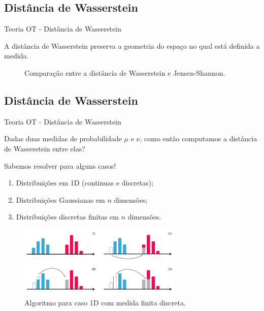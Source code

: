 \documentclass[10pt]{beamer}
\begin{document}
\subsection{Distância de Wasserstein}
\begin{frame}[fragile]{Teoria OT - Distância de Wasserstein}

	A distância de Wasserstein preserva a geometria do espaço
	no qual está definida a medida.

	\begin{figure}[H]
		\centering
		\def\svgscale{0.45}
		
		\caption{Comparação entre a distância de Wasserstein e Jensen-Shannon.}
		\label{fig:pub}
	\end{figure}

\end{frame}

\subsection{Distância de Wasserstein}
\begin{frame}[fragile]{Teoria OT - Distância de Wasserstein}

	Dadas duas medidas de probabilidade $\mu$ e $\nu$,
	como então computamos a distância de Wasserstein
	entre elas?

	\vspace{3mm}
	Sabemos resolver para alguns casos!
	\begin{enumerate}
		\item Distribuições em 1D (continuas e discretas);
		\item Distribuições Gaussianas em $n$ dimensões;
		\item Distribuições discretas finitas em $n$ dimensões.
	\end{enumerate}

	\begin{figure}[H]
		\begin{center}
			\includegraphics[width=0.7\textwidth]{Figures/ot-1d-discrete.pdf}
		\end{center}
		\caption{Algoritmo para caso 1D com medida finita discreta.}
	\end{figure}

\end{frame}
\end{document}
